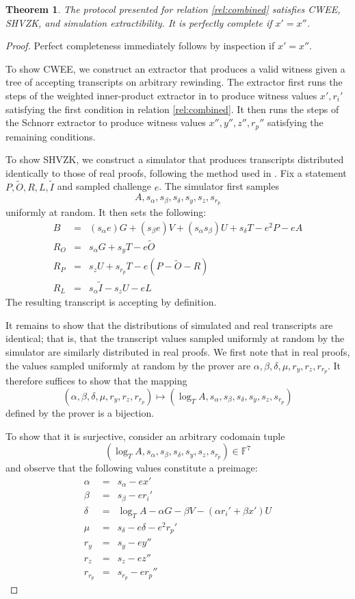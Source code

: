 \documentclass{article}
\newtheorem{theorem}{Theorem}
\theoremstyle{definition}
\newcommand{\FF}{\mathbb{F}}
\newcommand{\wt}[1]{\widetilde{#1}}
\begin{document}
\begin{theorem}
	The protocol presented for relation \ref{rel:combined} satisfies CWEE, SHVZK, and simulation extractibility.
	It is perfectly complete if $x' = x''$.
\end{theorem}

\begin{proof}
	Perfect completeness immediately follows by inspection if $x' = x''$.

	To show CWEE, we construct an extractor that produces a valid witness given a tree of accepting transcripts on arbitrary rewinding.
	The extractor first runs the steps of the weighted inner-product extractor in \cite{bpp} to produce witness values $x', r_i'$ satisfying the first condition in relation \ref{rel:combined}.
	It then runs the steps of the Schnorr extractor to produce witness values $x'', y'', z'', r_p''$ satisfying the remaining conditions.

	To show SHVZK, we construct a simulator that produces transcripts distributed identically to those of real proofs, following the method used in \cite{bpp}.
	Fix a statement $P, \wt{O}, R, L, \wt{I}$ and sampled challenge $e$.
	The simulator first samples
	$$A, s_\alpha, s_\beta, s_\delta, s_y, s_z, s_{r_p}$$
	uniformly at random.
	It then sets the following:
	\begin{eqnarray*}
		B &=& (s_\alpha e) G + (s_\beta e) V + (s_\alpha s_\beta) U + s_\delta T - e^2 P - e A \\
		R_O &=& s_\alpha G + s_y T - e \wt{O} \\
		R_P &=& s_z U + s_{r_p} T - e (P - \wt{O} - R) \\
		R_L &=& s_\alpha \wt{I} - s_z U - e L
	\end{eqnarray*}
	The resulting transcript is accepting by definition.

	It remains to show that the distributions of simulated and real transcripts are identical; that is, that the transcript values sampled uniformly at random by the simulator are similarly distributed in real proofs.
	We first note that in real proofs, the values sampled uniformly at random by the prover are $\alpha, \beta, \delta, \mu, r_y, r_z, r_{r_p}$.
	It therefore suffices to show that the mapping
	$$(\alpha, \beta, \delta, \mu, r_y, r_z, r_{r_p}) \mapsto (\log_T A, s_\alpha, s_\beta, s_\delta, s_y, s_z, s_{r_p})$$
	defined by the prover is a bijection.

	To show that it is surjective, consider an arbitrary codomain tuple $$(\log_T A, s_\alpha, s_\beta, s_\delta, s_y, s_z, s_{r_p}) \in \FF^7$$
	and observe that the following values constitute a preimage:
	\begin{eqnarray*}
		\alpha &=& s_\alpha - e x' \\
		\beta &=& s_\beta - e r_i' \\
		\delta &=& \log_T A - \alpha G - \beta V - (\alpha r_i' + \beta x') U \\
		\mu &=& s_\delta - e \delta - e^2 r_p' \\
		r_y &=& s_y - e y'' \\
		r_z &=& s_z - e z'' \\
		r_{r_p} &=& s_{r_p} - e r_p''
	\end{eqnarray*}


\end{proof}
\end{document}
